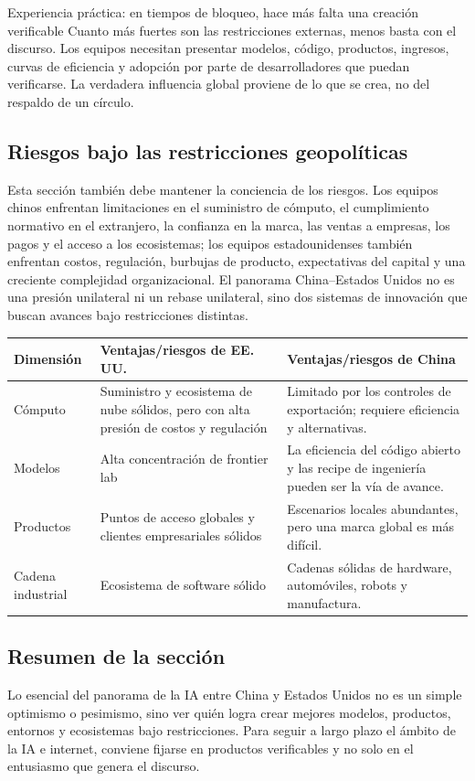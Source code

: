 \begin{importantbox}{Experiencia práctica: en tiempos de bloqueo, hace más falta una creación verificable}
Cuanto más fuertes son las restricciones externas, menos basta con el discurso. Los equipos necesitan presentar modelos, código, productos, ingresos, curvas de eficiencia y adopción por parte de desarrolladores que puedan verificarse. La verdadera influencia global proviene de lo que se crea, no del respaldo de un círculo.
\end{importantbox}

\subsection{Riesgos bajo las restricciones geopolíticas}

Esta sección también debe mantener la conciencia de los riesgos. Los equipos chinos enfrentan limitaciones en el suministro de cómputo, el cumplimiento normativo en el extranjero, la confianza en la marca, las ventas a empresas, los pagos y el acceso a los ecosistemas; los equipos estadounidenses también enfrentan costos, regulación, burbujas de producto, expectativas del capital y una creciente complejidad organizacional. El panorama China–Estados Unidos no es una presión unilateral ni un rebase unilateral, sino dos sistemas de innovación que buscan avances bajo restricciones distintas.

\noindent\begin{tabularx}{\textwidth}{p{}p{}X}
\toprule
Dimensión & Ventajas/riesgos de EE.\,UU. & Ventajas/riesgos de China \\
\midrule
Cómputo & Suministro y ecosistema de nube sólidos, pero con alta presión de costos y regulación & Limitado por los controles de exportación; requiere eficiencia y alternativas. \\
Modelos & Alta concentración de frontier lab & La eficiencia del código abierto y las recipe de ingeniería pueden ser la vía de avance. \\
Productos & Puntos de acceso globales y clientes empresariales sólidos & Escenarios locales abundantes, pero una marca global es más difícil. \\
Cadena industrial & Ecosistema de software sólido & Cadenas sólidas de hardware, automóviles, robots y manufactura. \\
\bottomrule
\end{tabularx}

\subsection{Resumen de la sección}

Lo esencial del panorama de la IA entre China y Estados Unidos no es un simple optimismo o pesimismo, sino ver quién logra crear mejores modelos, productos, entornos y ecosistemas bajo restricciones. Para seguir a largo plazo el ámbito de la IA e internet, conviene fijarse en productos verificables y no solo en el entusiasmo que genera el discurso.

